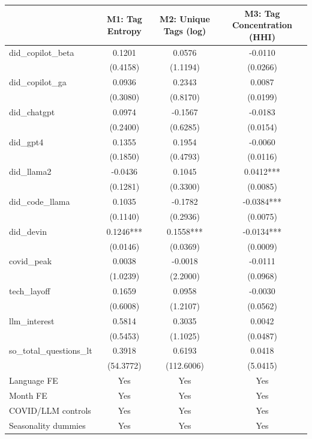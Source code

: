 \begin{tabular}{lccc}
\toprule
 & M1: Tag Entropy & M2: Unique Tags (log) & M3: Tag Concentration (HHI) \\
\midrule
did_copilot_beta & 0.1201 & 0.0576 & -0.0110 \\
 & (0.4158) & (1.1194) & (0.0266) \\
did_copilot_ga & 0.0936 & 0.2343 & 0.0087 \\
 & (0.3080) & (0.8170) & (0.0199) \\
did_chatgpt & 0.0974 & -0.1567 & -0.0183 \\
 & (0.2400) & (0.6285) & (0.0154) \\
did_gpt4 & 0.1355 & 0.1954 & -0.0060 \\
 & (0.1850) & (0.4793) & (0.0116) \\
did_llama2 & -0.0436 & 0.1045 & 0.0412*** \\
 & (0.1281) & (0.3300) & (0.0085) \\
did_code_llama & 0.1035 & -0.1782 & -0.0384*** \\
 & (0.1140) & (0.2936) & (0.0075) \\
did_devin & 0.1246*** & 0.1558*** & -0.0134*** \\
 & (0.0146) & (0.0369) & (0.0009) \\
covid_peak & 0.0038 & -0.0018 & -0.0111 \\
 & (1.0239) & (2.2000) & (0.0968) \\
tech_layoff & 0.1659 & 0.0958 & -0.0030 \\
 & (0.6008) & (1.2107) & (0.0562) \\
llm_interest & 0.5814 & 0.3035 & 0.0042 \\
 & (0.5453) & (1.1025) & (0.0487) \\
so_total_questions_lt & 0.3918 & 0.6193 & 0.0418 \\
 & (54.3772) & (112.6006) & (5.0415) \\
\midrule
Language FE & Yes & Yes & Yes \\
Month FE & Yes & Yes & Yes \\
COVID/LLM controls & Yes & Yes & Yes \\
Seasonality dummies & Yes & Yes & Yes \\
\bottomrule
\end{tabular}